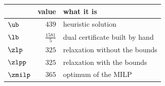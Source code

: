 \begin{center}\small
\begin{tabular}{lrl}
\toprule
 & value & what it is \\
\midrule
$\ub$ & $439$ & heuristic solution \\
$\lb$ & $\frac{1581}{5}$ & dual certificate built by hand \\
$\zlp$ & $325$ & relaxation without the bounds \\
$\zlpp$ & $325$ & relaxation with the bounds \\
$\zmilp$ & $365$ & optimum of the MILP \\
\bottomrule
\end{tabular}
\end{center}
